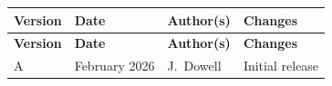 
\changerecordheader

\begin{longtable}{|p{1.5cm}|p{2.5cm}|p{3cm}|p{7cm}|}
    \hline
    \textbf{Version} & \textbf{Date} & \textbf{Author(s)} & \textbf{Changes} \\
    \hline
    \endfirsthead

    \hline
    \textbf{Version} & \textbf{Date} & \textbf{Author(s)} & \textbf{Changes} \\
    \hline
    \endhead

    \hline
    \endfoot

    A & February 2026 & J.~Dowell & Initial release \\
    \hline

\end{longtable}
